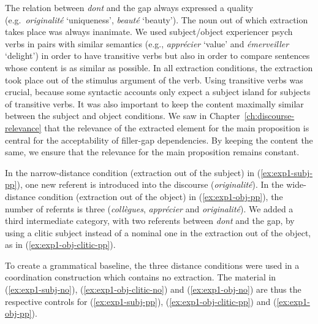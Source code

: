 The relation between \emph{dont} and the gap always expressed a quality (e.g.\ \emph{originalité} `uniqueness', \emph{beauté} `beauty'). The noun out of which extraction takes place was always inanimate. We used subject/object experiencer psych verbs in pairs with similar semantics (e.g., \emph{apprécier} `value' and \emph{émerveiller} `delight') in order to have transitive verbs but also in order to compare sentences whose content is as similar as possible. In all extraction conditions, the extraction took place out of the stimulus argument of the verb. Using transitive verbs was crucial, because some syntactic accounts only expect a subject island for subjects of transitive verbs. 
It was also important to keep the content maximally similar between the subject and object conditions. We saw in Chapter~\ref{ch:discourse-relevance} that the relevance of the extracted element for the main proposition is central for the acceptability of filler-gap dependencies. By keeping the content the same, we ensure that the relevance for the main proposition remains constant.

In the narrow-distance condition (extraction out of the subject) in (\ref{ex:exp1-subj-pp}), one new referent is introduced into the discourse (\emph{originalité}). In the wide-distance condition (extraction out of the object) in (\ref{ex:exp1-obj-pp}), the number of refernts is three (\emph{collègues}, \emph{apprécier} and \emph{originalité}). We added a third intermediate category, with two referents between \emph{dont} and the gap, by using a clitic subject instead of a nominal one in the extraction out of the object, as in (\ref{ex:exp1-obj-clitic-pp}). 

\label{ex:exp1-obj-clitic-pp}
\z 

To create a grammatical baseline, the three distance conditions were used in a coordination construction which contains no extraction. The material in (\ref{ex:exp1-subj-no}), (\ref{ex:exp1-obj-clitic-no}) and (\ref{ex:exp1-obj-no}) are thus the respective controls for (\ref{ex:exp1-subj-pp}), (\ref{ex:exp1-obj-clitic-pp}) and (\ref{ex:exp1-obj-pp}).

